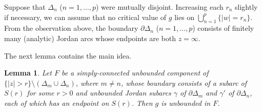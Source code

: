 \documentclass[a4paper,12pt]{amsart}
\theoremstyle{plain}
\newtheorem{lemma}[equation]{Lemma}
\theoremstyle{definition}
\theoremstyle{remark}
\numberwithin{equation}{section}
\begin{document}
Suppose that $\Delta_n$ ($n=1,\ldots, p$) were mutually disjoint.
Increasing each $r_n$ slightly if necessary,
we can assume that no critical value of $g$ lies on $\bigcup_{n=1}^p\{|w|=r_n\}$.
From the observation above, the boundary $\partial\Delta_n$ ($n=1,\ldots,p$)
consists of finitely many (analytic) Jordan arcs whose endpoints are both $z=\infty$.

The next lemma contains the main idea.

\begin{lemma}\label{th:Lindelof}
Let $F$ be a simply-connected unbounded component of 
$\{|z|>r\}\setminus(\Delta_m\cup\Delta_n)$, where $m\neq n$,
whose boundary consists of a subarc of $S(r)$ for some $r>0$
and unbounded Jordan subarcs $\gamma$ of $\partial\Delta_m$ and
$\gamma'$ of $\partial\Delta_n$, each of which has an endpoint on $S(r)$.
Then $g$ is unbounded in $F$.
\end{lemma}
\end{document}
